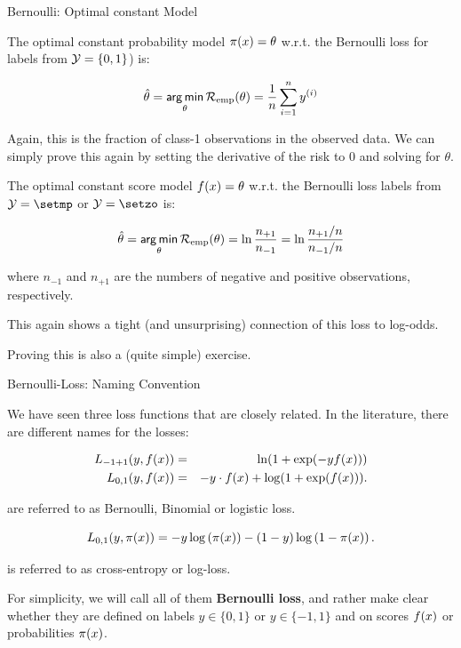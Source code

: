 \begin{vbframe}{Bernoulli: Optimal constant Model}

The optimal constant probability model $\pi(x) = \theta$ w.r.t. the Bernoulli loss for labels from $\mathcal{Y} = \{0, 1\}$) is:

\begin{eqnarray*}
  \hat{\theta} = \mathop{\sf arg\,min}_{\theta} \mathcal{R}_{\text{emp}}(\theta) = \frac{1}{n} \sum_{i=1}^n y^{(i)}
\end{eqnarray*}

Again, this is the fraction of class-1 observations in the observed data.
We can simply prove this again by setting the derivative of the risk to 0 and solving for $\theta$.

\framebreak

The optimal constant score model $f(x) = \theta$ w.r.t. the Bernoulli loss labels from $\Yspace = \setmp$ or $\Yspace = \setzo$ is:

\begin{eqnarray*}
  \hat{\theta} = \mathop{\sf arg\,min}_{\theta} \mathcal{R}_{\text{emp}}(\theta) = \ln \frac{n_{+1}}{n_{-1}} = \ln \frac{n_{+1}/n}{n_{-1}/n} 
\end{eqnarray*}

where $n_{-1}$ and $n_{+1}$ are the numbers of negative and positive observations, respectively.

\lz

This again shows a tight (and unsurprising) connection of this loss to log-odds.

\lz

Proving this is also a (quite simple) exercise.

\end{vbframe}

\begin{vbframe}{Bernoulli-Loss: Naming Convention}

We have seen three loss functions that are closely related. In the literature, there are different names for the losses: 

\begin{eqnarray*}
  L_{-1+1}(y, f(x)) &=& \ln(1+\exp(-yf(x))) \\
  L_{0, 1}(y, f(x)) &=& - y \cdot f(x) + \log(1 + \exp(f(x))). 
\end{eqnarray*}

are referred to as Bernoulli, Binomial or logistic loss. 

  $$
    L_{0,1}(y, \pi(x)) = - y \log \left(\pi(x)\right) - (1 - y) \log \left(1 - \pi(x)\right). 
  $$

is referred to as cross-entropy or log-loss. 

\lz 

For simplicity, we will call all of them \textbf{Bernoulli loss}, and rather make clear whether they are defined on labels $y \in \{0, 1\}$ or $y \in \{-1, 1\}$ and on scores $f(x)$ or probabilities $\pi(x)$. 

\end{vbframe}



